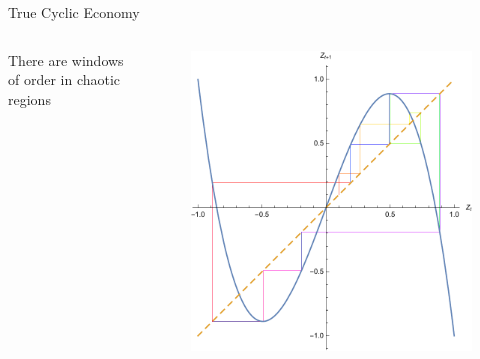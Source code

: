 \documentclass{beamer}
\begin{document}
\begin{frame}{True Cyclic Economy}
	\begin{columns}
		\begin{column}{0.5\textwidth}
				There are windows of order in chaotic regions
		\end{column}
		\begin{column}{0.5\textwidth}
			\begin{figure}
				\centering
				\includegraphics[width=\textwidth]{spillover_cycle.pdf}
			\end{figure}
		\end{column}
	\end{columns}
\end{frame}
\end{document}
